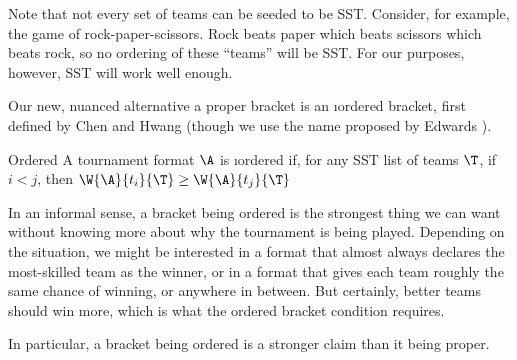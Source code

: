 {%


Note that not every set of teams can be seeded to be SST. Consider, for example, the game of rock-paper-scissors. Rock beats paper which beats scissors which beats rock, so no ordering of these ``teams'' will be SST. For our purposes, however, SST will work well enough.

Our new, nuanced alternative a proper bracket is an \i{ordered bracket}, first defined by Chen and Hwang \cite{define_ordered}  (though we use the name proposed by Edwards \cite{montana}).

\begin{definition}{Ordered}{}
    A tournament format $\A$ is \i{ordered} if, for any SST list of teams $\T$, if $i < j$, then $\W{\A}{t_i}{\T} \geq \W{\A}{t_j}{\T} $
\end{definition}

In an informal sense, a bracket being ordered is the strongest thing we can want without knowing more about why the tournament is being played. Depending on the situation, we might be interested in a format that almost always declares the most-skilled team as the winner, or in a format that gives each team roughly the same chance of winning, or anywhere in between. But certainly, better teams should win more, which is what the ordered bracket condition requires.

In particular, a bracket being ordered is a stronger claim than it being proper.

}
